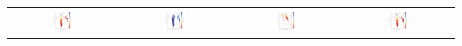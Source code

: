 \documentclass[12pt, a4paper]{article}
\begin{document}
\begin{center}
\begin{tabular}{cccc}
        \includegraphics[width=0.22\textwidth]{figs/GeneratedFigs/VelaX-1/HMXBHRPopulation.png} &
        \includegraphics[width=0.22\textwidth]{figs/GeneratedFigs/VelaX-1/HMXBsSurfaceCompHRDiagram.png} &
        \includegraphics[width=0.22\textwidth]{figs/GeneratedFigs/VelaX-1/VelaX1XrBPopulationHRComp.png} &
        \includegraphics[width=0.22\textwidth]{figs/GeneratedFigs/VelaX-1/VelaX1HMXBPopulationHRComp.png} \\
        

\end{tabular}
\end{center}
\end{document}
